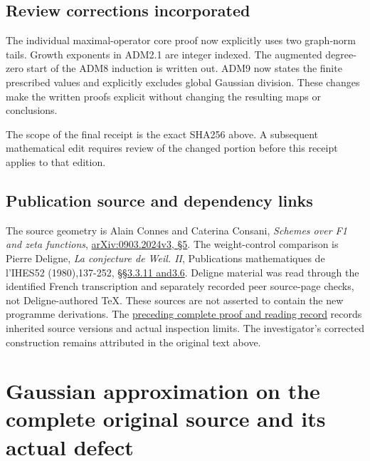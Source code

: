 \section{Review corrections
incorporated}\label{review-corrections-incorporated}

The individual maximal-operator core proof now explicitly uses two
graph-norm tails. Growth exponents in ADM2.1 are integer indexed. The
augmented degree-zero start of the ADM8 induction is written out. ADM9
now states the finite prescribed values and explicitly excludes global
Gaussian division. These changes make the written proofs explicit
without changing the resulting maps or conclusions.

The scope of the final receipt is the exact SHA256 above. A subsequent
mathematical edit requires review of the changed portion before this
receipt applies to that edition.

\section{Publication source and dependency
links}\label{publication-source-and-dependency-links-1}

The source geometry is Alain Connes and Caterina Consani, \emph{Schemes
over F1 and zeta functions},
\href{https://arxiv.org/abs/0903.2024v3}{arXiv:0903.2024v3, §5}. The
weight-control comparison is Pierre Deligne, \emph{La conjecture de
Weil. II}, Publications mathematiques de l'IHES52 (1980),137-252,
\href{https://www.numdam.org/item/PMIHES_1980__52__137_0/}{§§3.3.11
and3.6}. Deligne material was read through the identified French
transcription and separately recorded peer source-page checks, not
Deligne-authored TeX. These sources are not asserted to contain the new
programme derivations. The
\href{https://github.com/KokunoYumeto/zeta-function-research-reader/blob/36a82ecca98addb8a98b48204e349737856c7223/workbenches/splitzero-tandem/continuations/20260924-cohomology-weight-and-character-lifts/BUILD_AND_REVIEW.md}{preceding
complete proof and reading record} records inherited source versions and
actual inspection limits. The investigator's corrected construction
remains attributed in the original text above.

\chapter{Gaussian approximation on the complete original source and its
actual
defect}\label{gaussian-approximation-on-the-complete-original-source-and-its-actual-defect}

